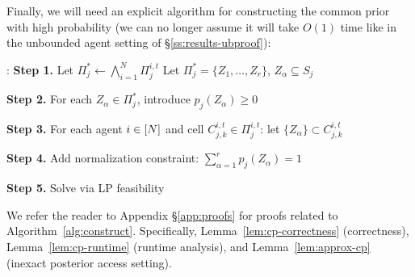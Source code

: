 Finally, we will need an explicit algorithm for constructing the common prior with high probability (we can no longer assume it will take $O(1)$ time like in the unbounded agent setting of \S\ref{ss:results-ubproof}):
\begin{algorithm}[ht]
\SetAlgoNoLine
\SetAlgoInsideSkip{0pt}     %
\caption{$\textsc{ConstructCommonPrior}\Bigl(\bigl\{\Pi_j^{i,t},\,\tau^{i,t}_j\bigr\}_{i=1}^N\Bigr)$}

\label{alg:construct}


\ConstructCommonPrior{}:\;
\textbf{Step 1.} Let \(\displaystyle \Pi_j^* \gets \bigwedge_{i=1}^N \Pi_j^{i,t}\)
Let \(\Pi_j^* = \{Z_1,\dots, Z_r\}\), \(Z_\alpha \subseteq S_j\)\;

\textbf{Step 2.} For each \(Z_\alpha \in \Pi_j^*\), introduce \(p_j(Z_\alpha)\ge0\)

\textbf{Step 3.} For each agent $i\in[N]$ and cell \(C_{j,k}^{i,t}\in \Pi_j^{i,t}\):
let \(\{Z_\alpha\}\subset C_{j,k}^{i,t}\)\;

\textbf{Step 4.} Add normalization constraint:
\(\displaystyle \sum_{\alpha=1}^r p_j(Z_\alpha)=1\)\;

\textbf{Step 5.} Solve via LP feasibility\;
\end{algorithm}

We refer the reader to Appendix \S\ref{app:proofs} for proofs related to Algorithm~\ref{alg:construct}.
Specifically, Lemma~\ref{lem:cp-correctness} (correctness), Lemma~\ref{lem:cp-runtime} (runtime analysis), and Lemma~\ref{lem:approx-cp} (inexact posterior access setting). 

